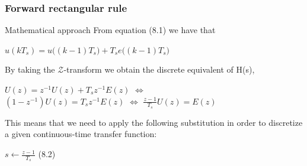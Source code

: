 \begin{frame}
	\frametitle{Forward rectangular rule}
	\begin{block}{Mathematical approach}
		From equation (8.1) we have that
		\begin{center}
			$u(kT_s) = u\big((k-1)T_s \big) + T_s e \big((k-1)T_s \big)$\\
		\end{center}
		By taking the $\mathcal{Z}$-transform we obtain the discrete equivalent of H(s),
		\vspace{-1em}
		\begin{center}
			$U(z) = z^{-1}U(z) + T_s z^{-1}E(z)$ \hspace{0.5em} $\Leftrightarrow$ \hspace{0.5em} \\$(1 - z^{-1})U(z) = T_s z^{-1} E(z)$ \hspace{0.5em} $\Leftrightarrow$ \hspace{0.5em} $\frac{z-1}{T_s}U(z) = E(z)$
		\end{center}
		This means that we need to apply the following substitution in order to discretize a given continuous-time transfer function:
		\begin{center}
			$s \gets \frac{z-1}{T_s}$ (8.2)
		\end{center}
	\end{block}
\end{frame}

